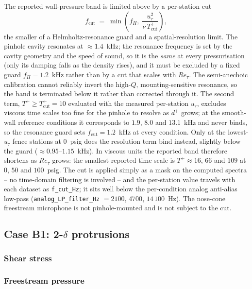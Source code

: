 The reported wall-pressure band is limited above by a per-station cut
\begin{equation*}
  f_{\mathrm{cut}} \;=\; \min\!\left(f_{H},\; \frac{u_\tau^2}{\nu\,T^+_{\mathrm{cut}}}\right),
\end{equation*}
the smaller of a Helmholtz-resonance guard and a spatial-resolution limit. The pinhole cavity resonates at ${\approx}1.4$~kHz; the resonance frequency is set by the cavity geometry and the speed of sound, so it is the \emph{same} at every pressurisation (only its damping falls as the density rises), and it must be excluded by a fixed guard $f_{H} = 1.2$~kHz rather than by a cut that scales with $Re_\tau$. The semi-anechoic calibration cannot reliably invert the high-$Q$, mounting-sensitive resonance, so the band is terminated below it rather than corrected through it. The second term, $T^+ \ge T^+_{\mathrm{cut}} = 10$ evaluated with the measured per-station $u_\tau$, excludes viscous time scales too fine for the pinhole to resolve as $d^+$ grows; at the smooth-wall reference conditions it corresponds to $1.9$, $8.0$ and $13.1$~kHz and never binds, so the resonance guard sets $f_{\mathrm{cut}} = 1.2$~kHz at every condition. Only at the lowest-$u_\tau$ fence stations at $0$~psig does the resolution term bind instead, slightly below the guard (${\approx}0.95$--$1.15$~kHz). In viscous units the reported band therefore shortens as $Re_\tau$ grows: the smallest reported time scale is $T^+ \approx 16$, $66$ and $109$ at $0$, $50$ and $100$~psig. The cut is applied simply as a mask on the computed spectra -- no time-domain filtering is involved -- and the per-station value travels with each dataset as \texttt{f\_cut\_Hz}; it sits well below the per-condition analog anti-alias low-pass (\texttt{analog\_LP\_filter\_Hz} $= 2100$, $4700$, $14\,100$~Hz). The nose-cone freestream microphone is not pinhole-mounted and is not subject to the cut.

\subsection{Case B1: 2-$\delta$ protrusions}
\subsubsection{Shear stress}

\subsubsection{Freestream pressure}

